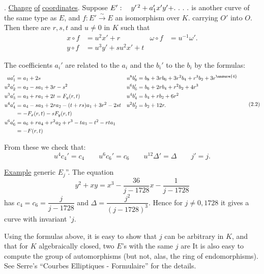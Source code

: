 \begingroup
\makeatletter\tagsleft@true{}. \uline{Change} \uline{of} \uline{coordinates}. Suppose $E':\quad y^{\prime\,2}+a_1'x'y'+\ldotp\,\ldotp\,\ldotp\,\ldotp$ is another curve of the same type as $E$, and $f:E'\overset{\sim}{\longrightarrow}E$ an isomorphism over $K$. carrying $O'$ into $O$. Then there are $r,s,t$ and $u\ne0$ in $K$ such that
\[
\begin{aligned}
x\circ f&=u^2x'+r & \omega\circ f&=u^{-1}\omega'.\\
y\circ f&=u^3y'+su^2x'+t
\end{aligned}
\tag*{(2.1)}
\]

The coefficients $a_i'$ are related to the $a_i$  and the $b_i'$ to the $b_i$ by the formulas:
\begingroup\scriptsize
\[
\begin{aligned}
ua_1'&=a_1+2s & u^8b_8'&=b_8+3rb_6+3r^2b_4+r^3b_2+3r^{\unsure{4}}\\
u^2a_2'&=a_2-sa_1+3r-s^2 & u^6b_6'&=b_6+2rb_4+r^2b_2+4r^3\\
u^3a_3'&=a_3+ra_1+2t=F_y(r,t) & u^4b_4'&=b_4+rb_2+6r^2\\
u^4a_4'&=a_4-sa_3+2ra_2-(t+rs)a_1+3r^2-2st
 & u^2b_2'&=b_2+12r.\\
 &= -F_x(r,t)-sF_y(r,t)\\
u^6a_6'&=a_6+ra_4+r^2a_2+r^3-ta_3-t^2-rta_1\\
 &= -F(r,t)
\end{aligned}
\tag*{(2.2)}
\]
\endgroup

From these we check that:
\[
u^4c_4'=c_4\qquad u^6c_6'=c_6\qquad
u^{12}\Delta'=\Delta\qquad j'=j.
\tag*{(2.3)}
\]

\uline{Example} generic $E_j$''. The equation
\[
y^2+xy=x^3-\frac{36}{j-1728}x-\frac{1}{j-1728}
\tag*{(2.4)}
\]
has $c_4=c_6=\dfrac{j}{j-1728}$ and $\Delta=\dfrac{j^2}{(j-1728)^3}$. Hence for $j\ne0,1728$ it gives a curve with invariant '$j$.

Using the formulas above, it is easy to show that $j$ can be arbitrary in $K$, and that for $K$ algebraically closed, two $E$'s with the same $j$ are  It is also easy to compute the group of automorphisms (but not, alas, the ring of endomorphisms). See Serre's ``Courbes Elliptiques - Formulaire'' for the details.
\endgroup

